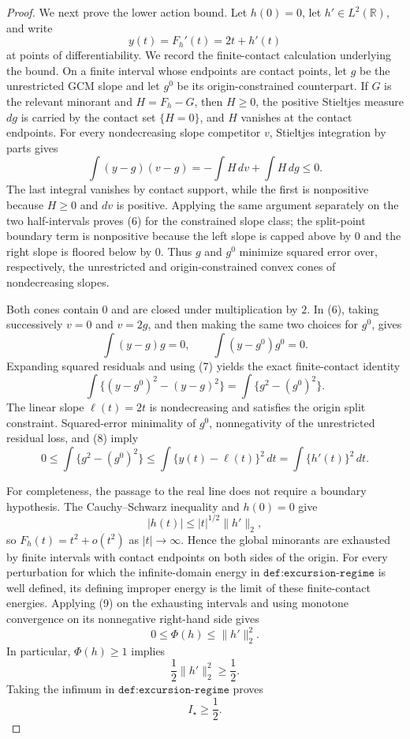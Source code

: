 \documentclass{article}
\begin{document}
\begin{proof}
We next prove the lower action bound.  Let \(h(0)=0\), let \(h'\in L^2(\mathbb R)\), and write
\[
 y(t)=F_h'(t)=2t+h'(t)
\]
at points of differentiability.  We record the finite-contact calculation underlying the bound.  On a finite interval whose endpoints are contact points, let \(g\) be the unrestricted GCM slope and let \(g^0\) be its origin-constrained counterpart.  If \(G\) is the relevant minorant and \(H=F_h-G\), then \(H\ge0\), the positive Stieltjes measure \(dg\) is carried by the contact set \(\{H=0\}\), and \(H\) vanishes at the contact endpoints.  For every nondecreasing slope competitor \(v\), Stieltjes integration by parts gives
\[
 \int (y-g)(v-g)
 =-\int H\,dv+\int H\,dg
 \le0. \tag{6}
\]
The last integral vanishes by contact support, while the first is nonpositive because \(H\ge0\) and \(dv\) is positive.  Applying the same argument separately on the two half-intervals proves (6) for the constrained slope class; the split-point boundary term is nonpositive because the left slope is capped above by \(0\) and the right slope is floored below by \(0\).  Thus \(g\) and \(g^0\) minimize squared error over, respectively, the unrestricted and origin-constrained convex cones of nondecreasing slopes.

Both cones contain \(0\) and are closed under multiplication by \(2\).  In (6), taking successively \(v=0\) and \(v=2g\), and then making the same two choices for \(g^0\), gives
\[
 \int (y-g)g=0,
 \qquad
 \int (y-g^0)g^0=0. \tag{7}
\]
Expanding squared residuals and using (7) yields the exact finite-contact identity
\[
 \int\{(y-g^0)^2-(y-g)^2\}
 =\int\{g^2-(g^0)^2\}. \tag{8}
\]
The linear slope \(\ell(t)=2t\) is nondecreasing and satisfies the origin split constraint.  Squared-error minimality of \(g^0\), nonnegativity of the unrestricted residual loss, and (8) imply
\[
 0\le \int\{g^2-(g^0)^2\}
 \le \int\{y(t)-\ell(t)\}^2\,dt
 =\int\{h'(t)\}^2\,dt. \tag{9}
\]

For completeness, the passage to the real line does not require a boundary hypothesis.  The Cauchy--Schwarz inequality and \(h(0)=0\) give
\[
 |h(t)|\le |t|^{1/2}\lVert h'\rVert_2,
\]
so \(F_h(t)=t^2+o(t^2)\) as \(|t|\to\infty\).  Hence the global minorants are exhausted by finite intervals with contact endpoints on both sides of the origin.  For every perturbation for which the infinite-domain energy in \(\texttt{def:excursion-regime}\) is well defined, its defining improper energy is the limit of these finite-contact energies.  Applying (9) on the exhausting intervals and using monotone convergence on its nonnegative right-hand side gives
\[
 0\le\Phi(h)\le\lVert h'\rVert_2^2. \tag{10}
\]
In particular, \(\Phi(h)\ge1\) implies
\[
 \frac12\lVert h'\rVert_2^2\ge\frac12.
\]
Taking the infimum in \(\texttt{def:excursion-regime}\) proves
\[
 I_\star\ge\frac12. \tag{11}
\]


\end{proof}
\end{document}
